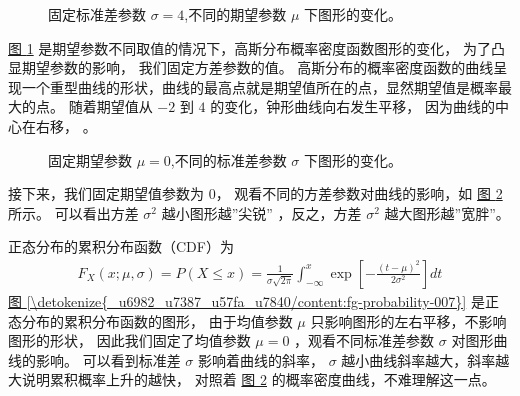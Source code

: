 \documentclass[letterpaper,10pt,english]{sphinxmanual}
\begin{document}
\begin{figure}[htbp]
\centering
\capstart

\noindent{}
\caption{固定标准差参数 \(\sigma=4\),不同的期望参数 \(\mu\) 下图形的变化。}\label{\detokenize{_u6982_u7387_u57fa_u7840/content:id26}}\label{\detokenize{_u6982_u7387_u57fa_u7840/content:fg-probability-005}}\end{figure}

\hyperref[\detokenize{_u6982_u7387_u57fa_u7840/content:fg-probability-005}]{图 \ref{\detokenize{_u6982_u7387_u57fa_u7840/content:fg-probability-005}}} 是期望参数不同取值的情况下，高斯分布概率密度函数图形的变化，
为了凸显期望参数的影响， 我们固定方差参数的值。
高斯分布的概率密度函数的曲线呈现一个重型曲线的形状，曲线的最高点就是期望值所在的点，显然期望值是概率最大的点。
随着期望值从 \(-2\) 到 \(4\) 的变化，钟形曲线向右发生平移，
因为曲线的中心在右移，
。

\begin{figure}[htbp]
\centering
\capstart

\noindent{}
\caption{固定期望参数 \(\mu=0\),不同的标准差参数 \(\sigma\) 下图形的变化。}\label{\detokenize{_u6982_u7387_u57fa_u7840/content:id27}}\label{\detokenize{_u6982_u7387_u57fa_u7840/content:fg-probability-006}}\end{figure}

接下来，我们固定期望值参数为 \(0\)，
观看不同的方差参数对曲线的影响，如 \hyperref[\detokenize{_u6982_u7387_u57fa_u7840/content:fg-probability-006}]{图 \ref{\detokenize{_u6982_u7387_u57fa_u7840/content:fg-probability-006}}} 所示。
可以看出方差 \(\sigma^2\) 越小图形越”尖锐”
，反之，方差 \(\sigma^2\) 越大图形越”宽胖”。

正态分布的累积分布函数（CDF）为
\begin{equation}\label{equation:概率基础/content:概率基础/content:68}
\begin{split}F_X(x;\mu,\sigma)=P(X \le x) = \frac{1}{\sigma\sqrt{2\pi }} \int_{-\infty}^x  \exp \left [ -\frac{(t-\mu)^2}{2 \sigma^2} \right ] dt\end{split}
\end{equation}
\hyperref[\detokenize{_u6982_u7387_u57fa_u7840/content:fg-probability-007}]{图 \ref{\detokenize{_u6982_u7387_u57fa_u7840/content:fg-probability-007}}} 是正态分布的累积分布函数的图形，
由于均值参数 \(\mu\) 只影响图形的左右平移，不影响图形的形状，
因此我们固定了均值参数 \(\mu=0\) ，观看不同标准差参数 \(\sigma\)
对图形曲线的影响。
可以看到标准差 \(\sigma\) 影响着曲线的斜率，
\(\sigma\) 越小曲线斜率越大，斜率越大说明累积概率上升的越快，
对照着 \hyperref[\detokenize{_u6982_u7387_u57fa_u7840/content:fg-probability-006}]{图 \ref{\detokenize{_u6982_u7387_u57fa_u7840/content:fg-probability-006}}} 的概率密度曲线，不难理解这一点。
\end{document}
